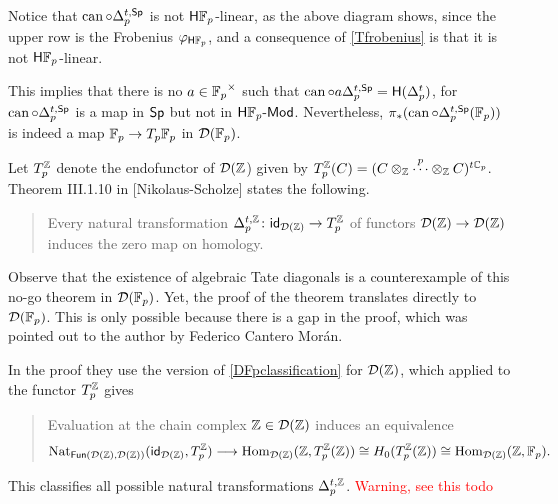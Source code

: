 \begin{remark}\label{rnonlinearity}
	Notice that \(\operatorname{can} \circ \Delta_p^{t,\mathsf{Sp}}\) is not \(\mathsf{H} {\mathbb{F}_p}\)-linear, as the above diagram shows, since the upper row is the Frobenius \(\varphi_{\mathsf{H} {\mathbb{F}_p}}\), and a consequence of \cref{Tfrobenius} is that it is not \(\mathsf{H} {\mathbb{F}_p}\)-linear.
	
	This implies that there is no \(a\in{\mathbb{F}_p}^\times\) such that \(\operatorname{can} \circ a \Delta_p^{t,\mathsf{Sp}} = \mathsf{H}(\Delta^t_p)\), for \(\operatorname{can} \circ \Delta_p^{t,\mathsf{Sp}}\) is a map in \(\mathsf{Sp}\) but not in \(\mathsf{H} {\mathbb{F}_p}\text{-}\mathsf{Mod}\).
	Nevertheless, \(\pi_*(\operatorname{can} \circ \Delta_p^{t,\mathsf{Sp}}({\mathbb{F}_p}))\) is indeed a map \({\mathbb{F}_p} \to T_p{\mathbb{F}_p}\) in \(\mathcal{D}({\mathbb{F}_p})\). 
\end{remark}
\begin{remark}
	Let \(T_p^{\mathbb{Z}}\) denote the endofunctor of \(\mathcal{D}(\mathbb{Z}\)) given by \(T_p^{\mathbb{Z}}(C)= (C\otimes_{\mathbb{Z}} \overset{p}{\cdots} \otimes_{\mathbb{Z}} C)^{t\mathbb{C}_p}\).
	Theorem III.1.10 in [Nikolaus-Scholze] states the following.
	\begin{quote}
		\begin{theorem}[No-go theorem]\label{no-go}
			Every natural transformation \(\Delta_p^{t, \mathbb{Z}} \colon \mathsf{id}_{\mathcal{D}(\mathbb{Z})} \to T_p^{\mathbb{Z}}\) of functors \(\mathcal{D}(\mathbb{Z})\to\mathcal{D}(\mathbb{Z})\) induces the zero map on homology.%
		\end{theorem}
	\end{quote}
	Observe that the existence of algebraic Tate diagonals is a counterexample of this no-go theorem in \(\mathcal{D}({\mathbb{F}_p})\).
	Yet, the proof of the theorem translates directly to \(\mathcal{D}({\mathbb{F}_p})\).
	This is only possible because there is a gap in the proof, which was pointed out to the author by Federico Cantero Morán.
	
	In the proof they use the version of \cref{DFpclassification} for \(\mathcal{D}(\mathbb{Z})\), which applied to the functor \(T_p^{\mathbb{Z}}\) gives
	\begin{quote}
		\begin{theorem}\label{DZclassification}
			Evaluation at the chain complex \(\mathbb{Z}\in\mathcal{D}(\mathbb{Z})\) induces an equivalence
			\[
			\mathrm{Nat}_{\mathsf{Fun}(\mathcal{D}(\mathbb{Z}),\mathcal{D}(\mathbb{Z}))}(\mathsf{id}_{\mathcal{D}(\mathbb{Z})},T_p^{\mathbb{Z}}) \longrightarrow \mathrm{Hom}_{\mathcal{D}(\mathbb{Z})}(\mathbb{Z},T_p^{\mathbb{Z}}(\mathbb{Z}))\cong H_0(T_p^{\mathbb{Z}}(\mathbb{Z})) \cong \mathrm{Hom}_{\mathcal{D}(\mathbb{Z})}(\mathbb{Z},{\mathbb{F}_p}).
			\]
		\end{theorem}
	\end{quote}
	This classifies all possible natural transformations \(\Delta_p^{t, \mathbb{Z}}\). \textcolor{red}{Warning, see this todo}
\end{remark}
